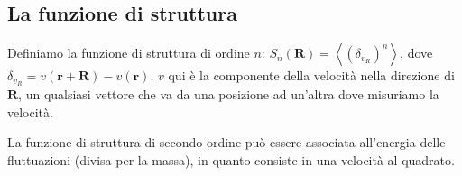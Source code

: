 \documentclass[12pt,a4paper]{article}
\numberwithin{equation}{section}
\begin{document}

\subsection{La funzione di struttura}

Definiamo la funzione di struttura di ordine $n$: $S_n (\mathbf{R}) = \left\langle
    (\delta _{v_R} )^n
 \right\rangle
$, dove 
$ \delta _{v_R} = v(\mathbf{r} + \mathbf{R}) - v( \mathbf{r})$. $v$ qui è la componente della velocità nella direzione di $\mathbf{R}$, un qualsiasi vettore che va da una posizione ad un'altra dove misuriamo la velocità.

La funzione di struttura di secondo ordine può essere associata all'energia delle fluttuazioni (divisa per la massa), in quanto consiste in una velocità al quadrato.
\end{document}

